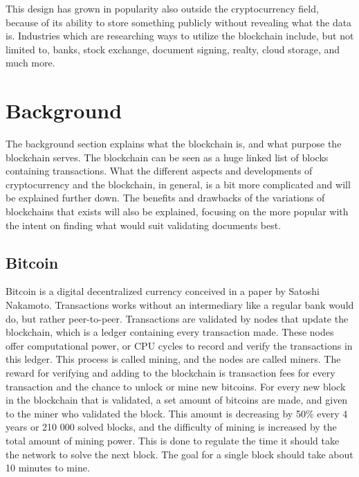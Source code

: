 \documentclass[12pt]{article}
\begin{document}
This design has grown in popularity also outside the cryptocurrency field, because of its ability to store something publicly without revealing what the data is. Industries which are researching ways to utilize the blockchain include, but not limited to, banks, stock exchange, document signing, realty, cloud storage, and much more. 

\section{Background}
The background section explains what the blockchain is, and what purpose the blockchain serves. The blockchain can be seen as a huge linked list of blocks containing transactions. What the different aspects and developments of cryptocurrency and the blockchain, in general, is a bit more complicated and will be explained further down. The benefits and drawbacks of the variations of blockchains that exists will also be explained, focusing on the more popular with the intent on finding what would suit validating documents best. 

\subsection{Bitcoin}

Bitcoin is a digital decentralized currency conceived in a paper by Satoshi Nakamoto\cite{nakamoto2009bitcoin}. Transactions works without an intermediary like a regular bank would do, but rather peer-to-peer. Transactions are validated by nodes that update the blockchain, which is a ledger containing every transaction made. These nodes offer computational power, or CPU cycles to record and verify the transactions in this ledger. This process is called mining, and the nodes are called miners. The reward for verifying and adding to the blockchain is transaction fees for every transaction and the chance to unlock or mine new bitcoins. For every new block in the blockchain that is validated, a set amount of bitcoins are made, and given to the miner who validated the block. This amount is decreasing by 50\% every 4 years or 210 000 solved blocks, and the difficulty of mining is increased by the total amount of mining power. This is done to regulate the time it should take the network to solve the next block. The goal for a single block should take about 10 minutes to mine.
\end{document}
